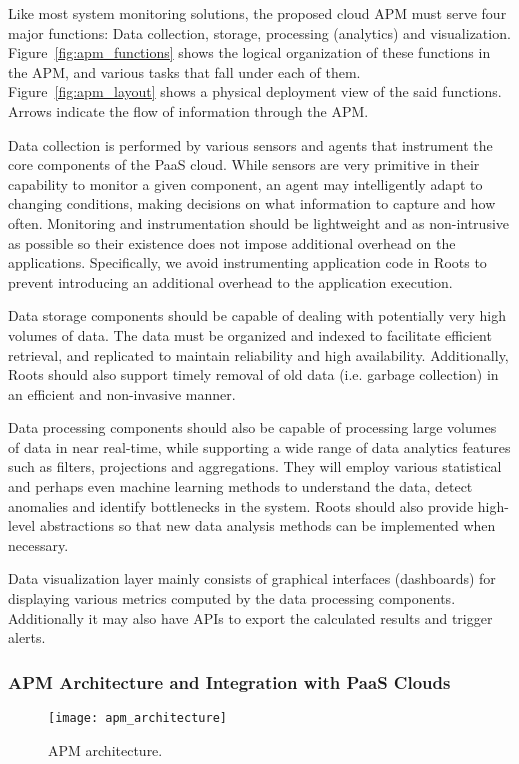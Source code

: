Like most system monitoring solutions, the proposed cloud APM must serve four major functions: Data
collection, storage, processing (analytics) and visualization. Figure~\ref{fig:apm_functions} shows the
logical organization of these functions in the APM, and various tasks that fall under each of them.
Figure~\ref{fig:apm_layout} shows a physical deployment view of the said functions. Arrows indicate
the flow of information through the APM.

Data collection is performed by various sensors and agents that instrument the
core components of the PaaS cloud.
While sensors are very primitive in their capability to monitor
a given component, an agent may intelligently adapt to changing conditions, making decisions on
what information to capture and how often. 
Monitoring and instrumentation should be lightweight and as non-intrusive
as possible so their existence does not impose additional overhead 
on the applications. Specifically, we avoid instrumenting application code in Roots to prevent
introducing an additional overhead to the application execution. 

Data storage components should be capable of
dealing with potentially very high volumes of data. The data must be organized and indexed
to facilitate efficient retrieval, and replicated to maintain reliability and high availability. 
Additionally, Roots should also support timely removal of old data (i.e. garbage collection)
in an efficient and non-invasive manner.

Data processing components should also be capable of processing large volumes of data in near real-time,
while supporting a wide range of data analytics features such as filters, projections and aggregations. 
They will employ various statistical and perhaps even machine learning methods to understand the
data, detect anomalies and identify bottlenecks in the system. Roots should also provide high-level
abstractions so that new data analysis methods can be implemented when necessary.

Data visualization layer mainly consists of graphical interfaces (dashboards) for displaying various
metrics computed by the data processing components. Additionally it may also have APIs to export
the calculated results and trigger alerts. 

\subsubsection{APM Architecture and Integration with PaaS Clouds}
\begin{figure}
\centering
\texttt{[image: apm\_architecture]}
\caption{APM architecture.}
\label{fig:apm_architecture}
\end{figure}

